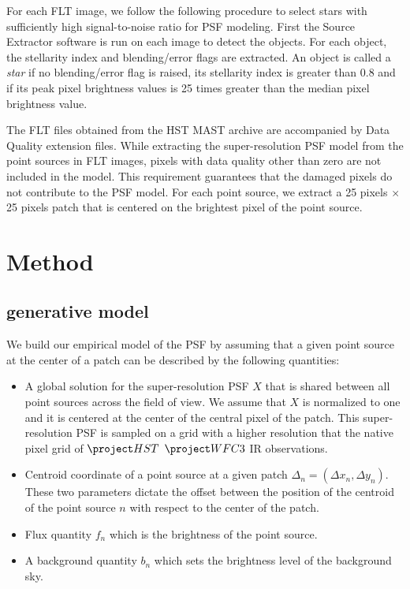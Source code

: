 For each FLT image, we follow the following procedure to select stars with sufficiently high signal-to-noise ratio 
for PSF modeling. First the Source Extractor software \citep{sextractor} is run on each image to detect the objects. 
For each object, the stellarity index and blending/error flags are extracted. An object is called a \emph{star} if no blending/error flag is 
raised, its stellarity index is greater than 0.8 and if its peak pixel brightness values is 25 times greater than the median pixel brightness 
value.  

The FLT files obtained from the HST MAST archive are accompanied by Data Quality extension files. While extracting the super-resolution PSF model 
from the point sources in FLT images, pixels with data quality other than zero are not included in the model. This requirement guarantees that 
the damaged pixels do not contribute to the PSF model. For each point source, we extract a 25 pixels $\times$ 25 pixels patch that is centered on the brightest 
pixel of the point source.   

\section{Method}\label{sec:method}

\subsection{generative model}

We build our empirical model of the PSF by assuming that a given point source at the center of a patch can be described by 
the following quantities: 

\begin{itemize}
\item A global solution for the super-resolution PSF $X$ that is shared between all point sources across the field of view. We assume 
that $X$ is normalized to one and it is centered at the center of the central pixel of the patch. This super-resolution PSF is sampled on 
a grid with a higher resolution that the native pixel grid of $\hst$ $\wfc$ IR observations.

\item Centroid coordinate of a point source at a given patch $\Delta_n = (\Delta x_n, \Delta y_n)$. 
These two parameters dictate the offset between the position of the centroid of the point source $n$ with 
respect to the center of the patch.

\item Flux quantity $f_n$ which is the brightness of the point source.

\item A background quantity $b_n$ which sets the brightness level of the background sky.

\end{itemize}

